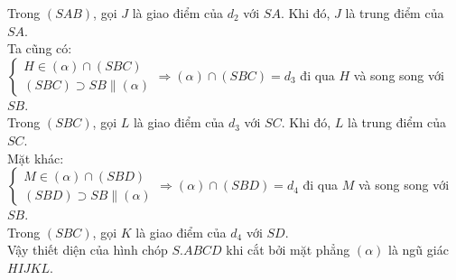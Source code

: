 \begin{ex}
{	Trong $\left(SAB\right)$, gọi $ J$ là giao điểm của $d_2$ với $ SA$. Khi đó,  $ J$ là trung điểm của $ SA$.\\
	 Ta cũng có:\\
	$\left\{\begin{array}{l}
	 H\in\left(\alpha\right)\cap\left(SBC\right)\\
	\left(SBC\right)\supset SB\parallel\left(\alpha\right) 
	\end{array}\right.\Rightarrow\left(\alpha\right)\cap\left(SBC\right)=d_3$ đi qua $ H$ và song song với $ SB$.\\
	Trong $\left(SBC\right)$, gọi $ L$ là giao điểm của $d_3$ với $ SC$.  Khi đó, $ L$ là trung điểm của $ SC$.\\
	Mặt khác:\\ 
	$\left\{\begin{array}{l}
	M\in\left(\alpha\right)\cap\left(SBD\right)\\ 
	 \left(SBD\right)\supset SB\parallel\left(\alpha\right)
	\end{array}\right.\Rightarrow\left(\alpha\right)\cap\left(SBD\right)=d_4$ đi qua $ M$ và song song với $ SB$.\\
	Trong $\left(SBC\right)$, gọi $ K$ là  giao điểm của $d_4$ với $ SD$.\\
	Vậy thiết diện của hình chóp $ S.ABCD$ khi cắt bởi mặt phẳng $\left(\alpha\right)$ là ngũ giác $ HIJKL$.} 
\end{ex}

